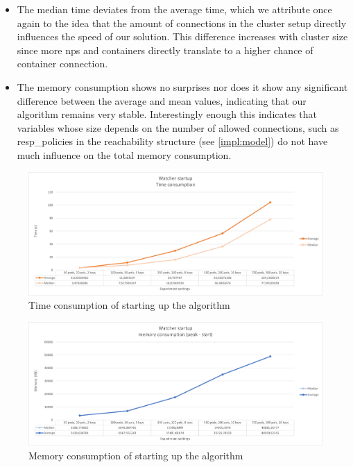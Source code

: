 \begin{itemize}
    	\item The median time deviates from the average time, which we attribute once again to the idea that the amount of connections in the cluster setup directly influences the speed of our solution. This difference increases with cluster size since more \acrshort{np}s and containers directly translate to a higher chance of container connection.
	\item The memory consumption shows no surprises nor does it show any significant difference between the average and mean values, indicating that our algorithm remains very stable. Interestingly enough this indicates that variables whose size depends on the number of allowed connections, such as resp\_policies  in the reachability structure (see \autoref{impl:model}) do not have much influence on the total memory consumption.

\end{itemize}

\begin{figure}[H]
    \centering
    \includegraphics[width=\textwidth]{images/experiment2/watcher-startup-time.png}
    \caption{Time consumption of starting up the algorithm}
    \label{fig:exp2-startup-time}
\end{figure}
\begin{figure}[H]
    \centering
    \includegraphics[width=\textwidth]{images/experiment2/watcher-startup-memory.png}
    \caption{Memory consumption of starting up the algorithm}
    \label{fig:exp2-startup-memory}
\end{figure}



